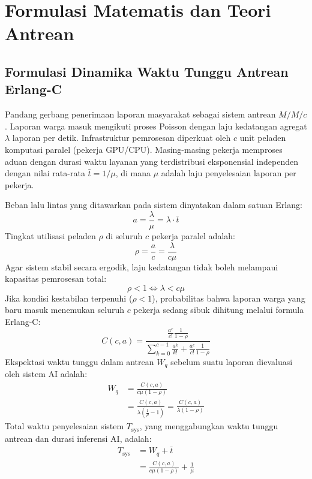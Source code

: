 \documentclass[journal,compsoc]{IEEEtran}
\begin{document}
\section{Formulasi Matematis dan Teori Antrean}

\subsection{Formulasi Dinamika Waktu Tunggu Antrean Erlang-C}
Pandang gerbang penerimaan laporan masyarakat sebagai sistem antrean $M/M/c$. Laporan warga masuk mengikuti proses Poisson dengan laju kedatangan agregat $\lambda$ laporan per detik. Infrastruktur pemrosesan diperkuat oleh $c$ unit peladen komputasi paralel (pekerja GPU/CPU). Masing-masing pekerja memproses aduan dengan durasi waktu layanan yang terdistribusi eksponensial independen dengan nilai rata-rata $\bar{t} = 1/\mu$, di mana $\mu$ adalah laju penyelesaian laporan per pekerja.

Beban lalu lintas yang ditawarkan pada sistem dinyatakan dalam satuan Erlang:
\begin{equation}
a = \frac{\lambda}{\mu} = \lambda \cdot \bar{t}
\end{equation}
Tingkat utilisasi peladen $\rho$ di seluruh $c$ pekerja paralel adalah:
\begin{equation}
\rho = \frac{a}{c} = \frac{\lambda}{c \mu}
\end{equation}
Agar sistem stabil secara ergodik, laju kedatangan tidak boleh melampaui kapasitas pemrosesan total:
\begin{equation}
\rho < 1 \iff \lambda < c \mu
\end{equation}
Jika kondisi kestabilan terpenuhi ($\rho < 1$), probabilitas bahwa laporan warga yang baru masuk menemukan seluruh $c$ pekerja sedang sibuk dihitung melalui formula Erlang-C:
\begin{equation}
C(c, a) = \frac{\frac{a^c}{c!} \frac{1}{1 - \rho}}{\sum_{k=0}^{c-1} \frac{a^k}{k!} + \frac{a^c}{c!} \frac{1}{1 - \rho}}
\end{equation}
Ekspektasi waktu tunggu dalam antrean $W_q$ sebelum suatu laporan dievaluasi oleh sistem AI adalah:
\begin{equation}
\begin{aligned}
W_q &= \frac{C(c, a)}{c \mu (1 - \rho)} \\
&= \frac{C(c, a)}{\lambda \left(\frac{1}{\rho} - 1\right)} = \frac{C(c, a)}{\lambda (1 - \rho)}
\end{aligned}
\end{equation}
Total waktu penyelesaian sistem $T_{\text{sys}}$, yang menggabungkan waktu tunggu antrean dan durasi inferensi AI, adalah:
\begin{equation}
\begin{aligned}
T_{\text{sys}} &= W_q + \bar{t} \\
&= \frac{C(c, a)}{c \mu (1 - \rho)} + \frac{1}{\mu}
\end{aligned}
\end{equation}
\end{document}
